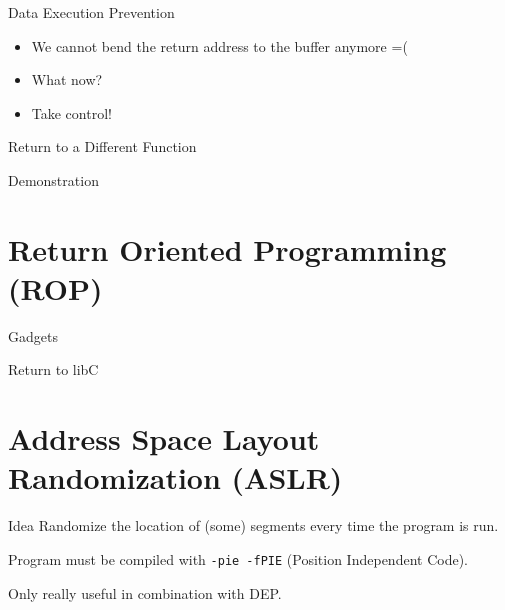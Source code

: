 \documentclass[beamer]{uibk}
\begin{document}
\begin{frame}{Data Execution Prevention}
    \begin{itemize}
        \item We cannot bend the return address to the buffer anymore =(
        \item What now?
        \bigskip
        \pause
        \item Take control!
    \end{itemize}
\end{frame}

\begin{frame}{Return to a Different Function}
    \begin{center}
        \huge Demonstration
    \end{center}
\end{frame}

\section{Return Oriented Programming (ROP)}

\begin{frame}{Gadgets}

\end{frame}

\begin{frame}{Return to libC}

\end{frame}

\section{Address Space Layout Randomization (ASLR)}

\begin{frame}{Idea}
    Randomize the location of (some) segments every time the program is run.
    \medskip

    Program must be compiled with \texttt{-pie -fPIE} (Position Independent
    Code).
    \medskip

    Only really useful in combination with DEP.
\end{frame}
\end{document}
